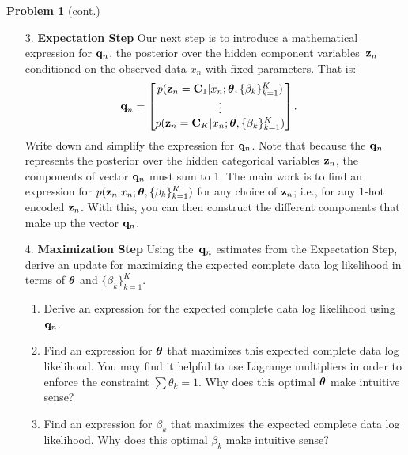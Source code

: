 \documentclass[submit]{harvardml}
\begin{document}
\newpage


\begin{framed}
\noindent\textbf{Problem 1} (cont.)\\
\begin{enumerate}
\item[3.] \textbf{Expectation Step} Our next step is to introduce a
  mathematical expression for $\mathbf{q}_n$, the posterior over the
  hidden component variables~$\mathbf{z}_n$ conditioned on the observed data
  $x_n$ with fixed parameters.
That is:
  \begin{align*}
    \textbf{q}_n &= \begin{bmatrix}
      p(\mathbf{z}_n =\mathbf{C}_1| x_n; \boldsymbol{\theta}, \{ \beta_k \}^K_{k=1}) \\
      \vdots \\
      p(\mathbf{z}_n =\mathbf{C}_K| x_n; \boldsymbol{\theta}, \{ \beta_k \}^K_{k=1})
    \end{bmatrix}.
  \end{align*}
%
  Write down and simplify the expression for
  $\mathbf{q}_n$.  Note that because the $\mathbf{q}_n$ represents the
  posterior over the hidden categorical variables $\mathbf{z}_n$, the
  components of vector $\mathbf{q}_n$ must sum to 1.
  The main work is to find an expression for $p(\mathbf{z}_n|x_n; \boldsymbol{\theta}, \{\beta_k\}^K_{k=1})$  for any choice of $\mathbf{z}_n$; i.e., for any 1-hot encoded $\mathbf{z}_n$. With this, you can then construct the different components that make up the vector $\mathbf{q}_n$.
  
\item[4.] \textbf{Maximization Step}
Using the~$\mathbf{q}_n$ estimates from the Expectation Step, derive an update for maximizing the expected complete data log likelihood in terms of $\boldsymbol{\theta}$ and $\{ \beta_k \}^K_{k=1}$.

\begin{enumerate}
    \item Derive an expression for the expected complete data log likelihood using $\mathbf{q}_n$.
    \item Find an expression for $\boldsymbol{\theta}$ that maximizes this expected complete data log likelihood. You may find it helpful to use Lagrange multipliers in order to enforce the constraint $\sum \theta_k = 1$. Why does this optimal $\boldsymbol{\theta}$ make intuitive sense?
    \item Find an expression for $\beta_k$ that maximizes the expected complete data log likelihood.  Why does this optimal $\beta_k$  make intuitive sense?
\end{enumerate}
    

\end{enumerate}
\end{framed}
\end{document}
